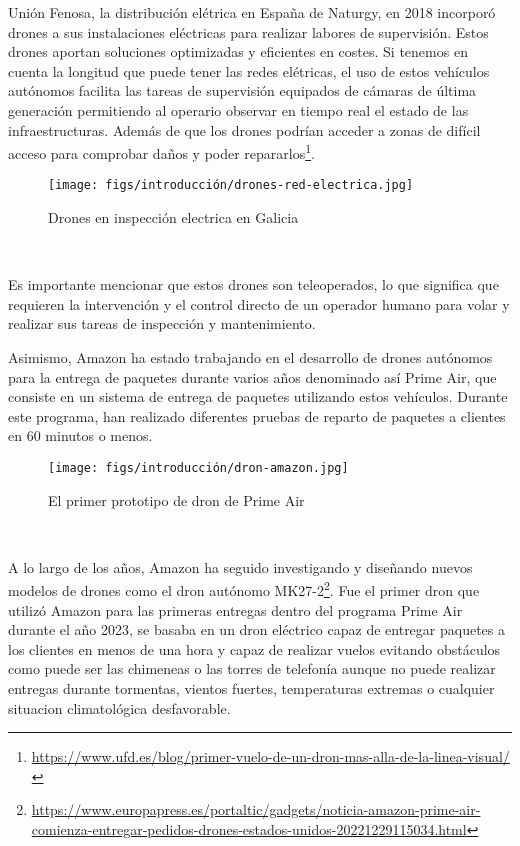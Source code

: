 Unión Fenosa, la distribución elétrica en España de Naturgy, en 2018 incorporó drones a sus instalaciones eléctricas para realizar labores de supervisión. Estos drones aportan 
soluciones optimizadas y eficientes en costes. Si tenemos en cuenta la longitud que puede tener las redes elétricas, el uso de estos vehículos
autónomos facilita las tareas de supervisión equipados de cámaras de última generación permitiendo al operario observar en tiempo real el estado de las infraestructuras. Además de que los
drones podrían acceder a zonas de difícil acceso para comprobar daños y poder repararlos\footnote{\url{https://www.ufd.es/blog/primer-vuelo-de-un-dron-mas-alla-de-la-linea-visual/}}. \newline 


\begin{figure} [H]
  \begin{center}
    \texttt{[image: figs/introducción/drones-red-electrica.jpg]}
  \end{center}
  \caption{Drones en inspección electrica en Galicia}
  \label{fig:Fenosa}
\end{figure}\

Es importante mencionar que estos drones son teleoperados, lo que significa que requieren la intervención y el control directo de un operador humano para volar y realizar sus tareas 
de inspección y mantenimiento.\newline

Asimismo, Amazon ha estado trabajando en el desarrollo de drones autónomos para la entrega de paquetes durante varios años denominado así Prime Air\cite{AmazonPrimeAir}, 
que consiste en un sistema de entrega de paquetes utilizando estos vehículos. Durante este programa, han realizado diferentes pruebas de reparto de paquetes a clientes
en 60 minutos o menos. \newline

\begin{figure} [H]
  \begin{center}
    \texttt{[image: figs/introducción/dron-amazon.jpg]}
  \end{center}
  \caption{El primer prototipo de dron de Prime Air}
  \label{fig:PrimerPrimeAir}
\end{figure}\

A lo largo de los años, Amazon ha seguido investigando y diseñando nuevos modelos de drones como el dron autónomo MK27-2\footnote{\url{https://www.europapress.es/portaltic/gadgets/noticia-amazon-prime-air-comienza-entregar-pedidos-drones-estados-unidos-20221229115034.html}}. Fue el primer 
dron que utilizó Amazon para 
las primeras entregas dentro del programa Prime Air durante el año 2023, se basaba en un dron eléctrico capaz de entregar paquetes a los clientes en menos de una
hora y capaz de realizar vuelos evitando obstáculos como puede ser las chimeneas o las torres de telefonía aunque no puede realizar entregas durante tormentas, vientos fuertes, temperaturas
extremas o cualquier situacion climatológica desfavorable. 

